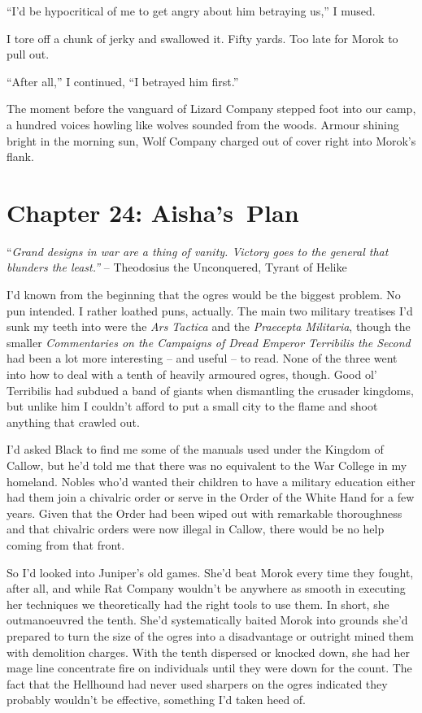 \documentclass[12pt, openany]{book}
\begin{document}
“I’d be hypocritical of me to get angry about him betraying us,” I mused.

I tore off a chunk of jerky and swallowed it. Fifty yards. Too late for Morok to pull out.

“After all,” I continued, “I betrayed him first.”

The moment before the vanguard of Lizard Company stepped foot into our camp, a hundred voices howling like wolves sounded from the woods. Armour shining bright in the morning sun, Wolf Company charged out of cover right into Morok’s flank.
\clearpage
\chapter{Chapter 24: Aisha’s Plan}

“\textit{Grand designs in war are a thing of vanity. Victory goes to the general that blunders the least.”}
– Theodosius the Unconquered, Tyrant of Helike

I’d known from the beginning that the ogres would be the biggest problem. No pun intended. I rather loathed puns, actually. The main two military treatises I’d sunk my teeth into were the \textit{Ars Tactica} and the \textit{Praecepta Militaria}, though the smaller\textit{ Commentaries on the Campaigns of Dread Emperor Terribilis the Second} had been a lot more interesting – and useful – to read. None of the three went into how to deal with a tenth of heavily armoured ogres, though. Good ol’ Terribilis had subdued a band of giants when dismantling the crusader kingdoms, but unlike him I couldn’t afford to put a small city to the flame and shoot anything that crawled out. 

I’d asked Black to find me some of the manuals used under the Kingdom of Callow, but he’d told me that there was no equivalent to the War College in my homeland. Nobles who’d wanted their children to have a military education either had them join a chivalric order or serve in the Order of the White Hand for a few years. Given that the Order had been wiped out with remarkable thoroughness and that chivalric orders were now illegal in Callow, there would be no help coming from that front.

So I’d looked into Juniper’s old games. She’d beat Morok every time they fought, after all, and while Rat Company wouldn’t be anywhere as smooth in executing her techniques we theoretically had the right tools to use them. In short, she outmanoeuvred the tenth. She’d systematically baited Morok into grounds she’d prepared to turn the size of the ogres into a disadvantage or outright mined them with demolition charges. With the tenth dispersed or knocked down, she had her mage line concentrate fire on individuals until they were down for the count. The fact that the Hellhound had never used sharpers on the ogres indicated they probably wouldn’t be effective, something I’d taken heed of. 
\end{document}
